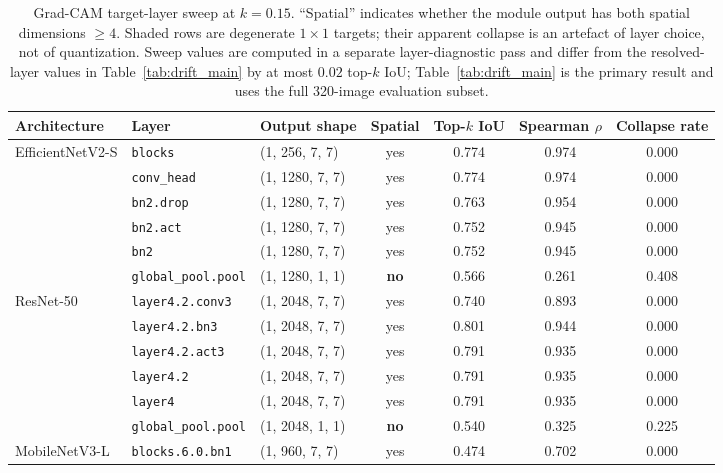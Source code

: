 \documentclass[fleqn,10pt]{wlscirep}
\begin{document}
\begin{table}[!ht]
\centering
\scriptsize
\caption{Grad-CAM target-layer sweep at $k = 0.15$. ``Spatial'' indicates whether the module output has both spatial dimensions $\geq 4$. Shaded rows are degenerate $1 \times 1$ targets; their apparent collapse is an artefact of layer choice, not of quantization. Sweep values are computed in a separate layer-diagnostic pass and differ from the resolved-layer values in Table~\ref{tab:drift_main} by at most $0.02$ top-$k$ IoU; Table~\ref{tab:drift_main} is the primary result and uses the full 320-image evaluation subset.}
\label{tab:cam_layer_sweep}
\setlength{\tabcolsep}{4pt}
\begin{tabular}{ll l c ccc}
\toprule
\textbf{Architecture} & \textbf{Layer} & \textbf{Output shape} & \textbf{Spatial} & \textbf{Top-$k$ IoU} & \textbf{Spearman $\rho$} & \textbf{Collapse rate} \\
\midrule
\multirow{6}{*}{EfficientNetV2-S}
 & \texttt{blocks} & (1, 256, 7, 7) & yes & 0.774 & 0.974 & 0.000 \\
 & \texttt{conv\_head} & (1, 1280, 7, 7) & yes & 0.774 & 0.974 & 0.000 \\
 & \texttt{bn2.drop} & (1, 1280, 7, 7) & yes & 0.763 & 0.954 & 0.000 \\
 & \texttt{bn2.act} & (1, 1280, 7, 7) & yes & 0.752 & 0.945 & 0.000 \\
 & \texttt{bn2} & (1, 1280, 7, 7) & yes & 0.752 & 0.945 & 0.000 \\
 & \texttt{global\_pool.pool} & (1, 1280, 1, 1) & \textbf{no} & \cellcolor{quantred!12}0.566 & \cellcolor{quantred!12}0.261 & \cellcolor{quantred!12}0.408 \\
\midrule
\multirow{6}{*}{ResNet-50}
 & \texttt{layer4.2.conv3} & (1, 2048, 7, 7) & yes & 0.740 & 0.893 & 0.000 \\
 & \texttt{layer4.2.bn3} & (1, 2048, 7, 7) & yes & 0.801 & 0.944 & 0.000 \\
 & \texttt{layer4.2.act3} & (1, 2048, 7, 7) & yes & 0.791 & 0.935 & 0.000 \\
 & \texttt{layer4.2} & (1, 2048, 7, 7) & yes & 0.791 & 0.935 & 0.000 \\
 & \texttt{layer4} & (1, 2048, 7, 7) & yes & 0.791 & 0.935 & 0.000 \\
 & \texttt{global\_pool.pool} & (1, 2048, 1, 1) & \textbf{no} & \cellcolor{quantred!12}0.540 & \cellcolor{quantred!12}0.325 & \cellcolor{quantred!12}0.225 \\
\midrule
\multirow{6}{*}{MobileNetV3-L}
 & \texttt{blocks.6.0.bn1} & (1, 960, 7, 7) & yes & 0.474 & 0.702 & 0.000 \\

\end{tabular}
\end{table}
\end{document}
